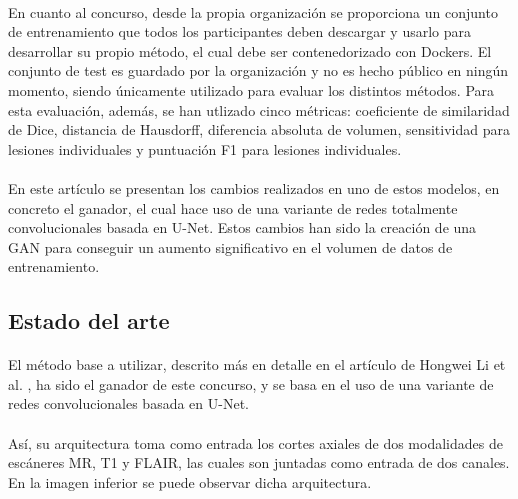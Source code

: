 \documentclass[12pt]{article}
\begin{document}
	\paragraph{}
	En cuanto al concurso, desde la propia organización se proporciona un conjunto de entrenamiento que todos los participantes deben descargar y usarlo para desarrollar su propio método, el cual debe ser contenedorizado con Dockers. El conjunto de test es guardado por la organización y no es hecho público en ningún momento, siendo únicamente utilizado para evaluar los distintos métodos. Para esta evaluación, además,  se han utlizado cinco métricas: coeficiente de similaridad de Dice, distancia de Hausdorff, diferencia absoluta de volumen, sensitividad para lesiones individuales y puntuación F1 para lesiones individuales.
	
	\paragraph{}
	En este artículo se presentan los cambios realizados en uno de estos modelos, en concreto el ganador, el cual hace uso de una variante de redes totalmente convolucionales basada en U-Net. Estos cambios han sido la creación de una GAN para conseguir un aumento significativo en el volumen de datos de entrenamiento.
	
	\subsection{Estado del arte}

	\paragraph{}
	El método base a utilizar, descrito más en detalle en el artículo de Hongwei Li et al. \cite{Fully convolutional network ensembles for white matter hyperintensities segmentation in MR images}, ha sido el ganador de este concurso, y se basa en el uso de una variante de redes convolucionales basada en U-Net.
	
	\paragraph{}
	Así, su arquitectura toma como entrada los cortes axiales de dos modalidades de escáneres MR, T1 y FLAIR, las cuales son juntadas como entrada de dos canales. En la imagen inferior se puede observar dicha arquitectura.
	
	\paragraph{}
	
\end{document}

